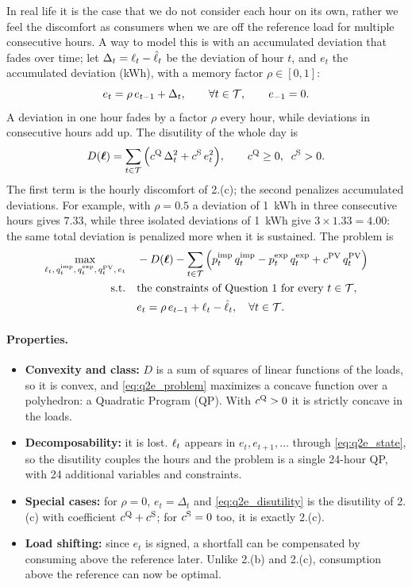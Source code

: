 In real life it is the case that we do not consider each hour on its own, rather we feel the discomfort as consumers when we are off the reference load for multiple consecutive hours. A way to model this is with an accumulated deviation that fades over time; let $\Delta_t = \ell_{t} - \hat{\ell}_{t}$ be the deviation of hour $t$, and $e_t$ the accumulated deviation (kWh), with a memory factor $\rho \in [0,1]$:
\begin{equation}
    e_t = \rho \, e_{t-1} + \Delta_t, \qquad \forall t \in \mathcal{T}, \qquad e_{-1} = 0.
    \label{eq:q2e_state}
\end{equation}
A deviation in one hour fades by a factor $\rho$ every hour, while deviations in consecutive hours add up. The disutility of the whole day is
\begin{equation}
    D(\boldsymbol{\ell}) = \sum_{t \in \mathcal{T}} \Big( c^{\mathrm{Q}} \, \Delta_t^2 + c^{\mathrm{S}} \, e_t^2 \Big),
    \qquad c^{\mathrm{Q}} \geq 0, \;\; c^{\mathrm{S}} > 0.
    \label{eq:q2e_disutility}
\end{equation}
The first term is the hourly discomfort of 2.(c); the second penalizes accumulated deviations. For example, with $\rho = 0.5$ a deviation of 1~kWh in three consecutive hours gives $7.33$, while three isolated deviations of 1~kWh give $3 \times 1.33 = 4.00$: the same total deviation is penalized more when it is sustained. The problem is
\begin{align}
    \max_{\ell_{t},\, q^{\mathrm{imp}}_{t},\, q^{\mathrm{exp}}_{t},\, q^{\mathrm{PV}}_{t},\, e_t} \quad
    & - D(\boldsymbol{\ell}) - \sum_{t \in \mathcal{T}} \Big( p^{\mathrm{imp}}_{t} \, q^{\mathrm{imp}}_{t} - p^{\mathrm{exp}}_{t} \, q^{\mathrm{exp}}_{t} + c^{\mathrm{PV}} \, q^{\mathrm{PV}}_{t} \Big)
    \label{eq:q2e_problem} \\
    \text{s.t.} \quad
    & \text{the constraints of Question~1 for every } t \in \mathcal{T}, \nonumber \\
    & e_t = \rho \, e_{t-1} + \ell_{t} - \hat{\ell}_{t}, \quad \forall t \in \mathcal{T}. \nonumber
\end{align}

\paragraph{Properties.}
\begin{itemize}
    \item \textbf{Convexity and class:} $D$ is a sum of squares of linear functions of the loads, so it is convex, and \eqref{eq:q2e_problem} maximizes a concave function over a polyhedron: a Quadratic Program (QP). With $c^{\mathrm{Q}} > 0$ it is strictly concave in the loads.
    \item \textbf{Decomposability:} it is lost. $\ell_{t}$ appears in $e_t, e_{t+1}, \dots$ through \eqref{eq:q2e_state}, so the disutility couples the hours and the problem is a single
    24-hour QP, with 24 additional variables and constraints.
    \item \textbf{Special cases:} for $\rho = 0$, $e_t =\Delta_t$ and \eqref{eq:q2e_disutility} is the disutility of 2.(c) with coefficient $c^{\mathrm{Q}} + c^{\mathrm{S}}$; for $c^{\mathrm{S}} = 0$ too, it is exactly 2.(c).
    \item \textbf{Load shifting:} since $e_t$ is signed, a shortfall can be compensated by consuming above the reference later. Unlike 2.(b) and 2.(c), consumption above the reference can now be optimal.
\end{itemize}

